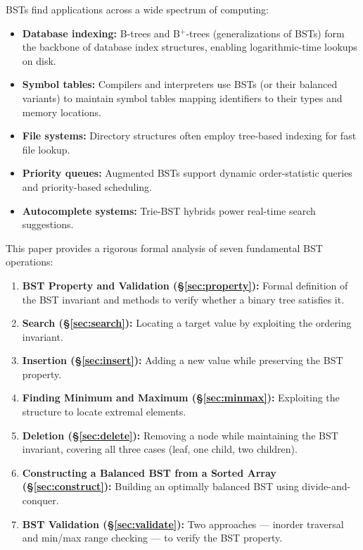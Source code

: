 \documentclass[10pt,journal,compsoc,onecolumn]{IEEEtran}
\begin{document}
BSTs find applications across a wide spectrum of computing:
\begin{itemize}
    \item \textbf{Database indexing:} B-trees and B$^+$-trees (generalizations of BSTs) form the backbone of database index structures, enabling logarithmic-time lookups on disk.
    \item \textbf{Symbol tables:} Compilers and interpreters use BSTs (or their balanced variants) to maintain symbol tables mapping identifiers to their types and memory locations.
    \item \textbf{File systems:} Directory structures often employ tree-based indexing for fast file lookup.
    \item \textbf{Priority queues:} Augmented BSTs support dynamic order-statistic queries and priority-based scheduling.
    \item \textbf{Autocomplete systems:} Trie-BST hybrids power real-time search suggestions.
\end{itemize}

This paper provides a rigorous formal analysis of seven fundamental BST operations:

\begin{enumerate}
    \item \textbf{BST Property and Validation (\S\ref{sec:property}):} Formal definition of the BST invariant and methods to verify whether a binary tree satisfies it.
    \item \textbf{Search (\S\ref{sec:search}):} Locating a target value by exploiting the ordering invariant.
    \item \textbf{Insertion (\S\ref{sec:insert}):} Adding a new value while preserving the BST property.
    \item \textbf{Finding Minimum and Maximum (\S\ref{sec:minmax}):} Exploiting the structure to locate extremal elements.
    \item \textbf{Deletion (\S\ref{sec:delete}):} Removing a node while maintaining the BST invariant, covering all three cases (leaf, one child, two children).
    \item \textbf{Constructing a Balanced BST from a Sorted Array (\S\ref{sec:construct}):} Building an optimally balanced BST using divide-and-conquer.
    \item \textbf{BST Validation (\S\ref{sec:validate}):} Two approaches --- inorder traversal and min/max range checking --- to verify the BST property.
\end{enumerate}
\end{document}
